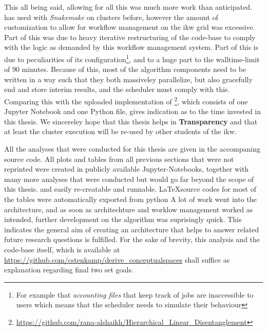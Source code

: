 This all being said, allowing for all this was much more work than anticipated. \me has used with \textit{Snakemake} on clusters before, however the amount of customization to allow for workflow management on the \gls{ikw} grid was excessive. Part of this was due to heavy iterative restructuring of the code-base to comply with the logic as demanded by this workflow management system. Part of this is due to peculiarities of its configuration\footnote{For example that \textit{accounting files} that keep track of jobs are inaccessible to users which means that the scheduler needs to simulate their behaviour}, and to a huge part to the walltime-limit of 90 minutes. Because of this, most of the algorithm components need to be written in a way such that they both massiveley parallelize, but also gracefully end and store interim results, and the scheduler must comply with this. Comparing this with the uploaded implementation of \cite{Alshaikh2020}\footnote{\url{https://github.com/rana-alshaikh/Hierarchical_Linear_Disentanglement}}, which consists of one Jupyter Notebook and one Python file, gives indication as to the time invested in this thesis. We sincereley hope that this thesis helps in \textbf{Transparency} and that at least the cluster execution will be re-used by other students of the \gls{ikw}.

All the analyses that were conducted for this thesis are given in the accompaning source code. All plots and tables from all previous sections that were not reprinted were created in publicly available Jupyter-Notebooks, together with many more analyses that were conducted but would go far beyond the scope of this thesis.  and easily re-creatable and runnable. \LaTeX {source codes for most of the tables were automatically exported from python} A lot of work went into the architecture, and as soon as architechture and worklow management worked as intended, further development on the algorithm was suprisingly quick. This indicates the general aim of creating an architecture that helps to answer related future research questions is fulfilled. For the sake of brevity, this analysis and the code-base itself, which is available at \url{https://github.com/cstenkamp/derive_conceptualspaces} shall suffice as explanation regarding final two set goals. 



